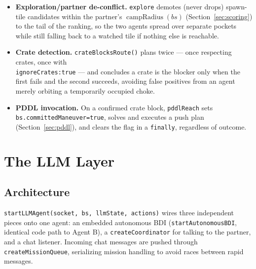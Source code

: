 \documentclass[11pt,a4paper]{article}
\begin{document}
\begin{itemize}
  pass (\texttt{pathfinding/dijkstra.js}) from the agent's position, giving $O(1)$
  penalty-inclusive reachability/cost lookups reused by \texttt{goNear}, \texttt{explore}'s
  ranking (\texttt{findCellsToExplore}) and the camp anchor's cluster-centroid choice
  (\texttt{clusterCenter}) --- replacing one A*/BFS probe per candidate. An unreachable candidate
  is dropped rather than scored as \texttt{NaN}; without a usable map, callers fall back to plain
  geometric distance.
  \item \textbf{Exploration/partner de-conflict.} \texttt{explore} demotes (never drops)
  spawn-tile candidates within the partner's $\operatorname{campRadius}(bs)$
  (Section~\ref{sec:scoring}) to the tail of the ranking, so the two agents spread over separate
  pockets while still falling back to a watched tile if nothing else is reachable.
  \item \textbf{Crate detection.} \texttt{crateBlocksRoute()} plans twice --- once respecting
  crates, once with \\ \texttt{ignoreCrates:true} --- and concludes a crate is the blocker only when
  the first fails and the second succeeds, avoiding false positives from an agent merely
  orbiting a temporarily occupied choke.
  \item \textbf{PDDL invocation.} On a confirmed crate block, \texttt{pddlReach} sets
  \texttt{bs.committedManeuver=true}, solves and executes a push plan (Section~\ref{sec:pddl}),
  and clears the flag in a \texttt{finally}, regardless of outcome.
\end{itemize}

\section{The LLM Layer}
\label{sec:llm}

\subsection{Architecture}

\texttt{startLLMAgent(socket, bs, llmState, actions)} wires three independent pieces onto one
agent: an embedded autonomous BDI (\texttt{startAutonomousBDI}, identical code path to Agent B),
a \texttt{createCoordinator} for talking to the partner, and a chat listener. Incoming chat
messages are pushed through \texttt{createMissionQueue}, serializing mission handling to avoid
races between rapid messages.
\end{document}
